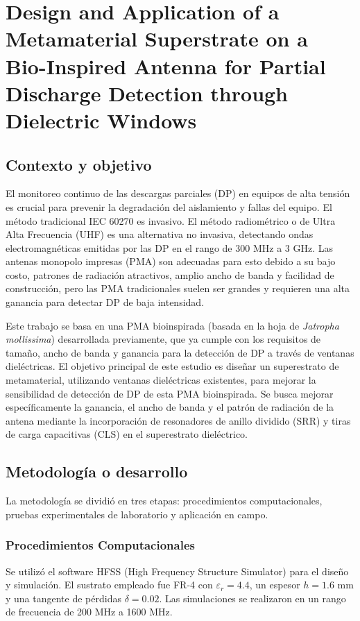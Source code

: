 \section{Design and Application of a Metamaterial Superstrate on a Bio-Inspired Antenna for Partial Discharge Detection through Dielectric Windows}

\subsection*{Contexto y objetivo}
El monitoreo continuo de las descargas parciales (DP) en equipos de alta tensión es crucial para prevenir la degradación del aislamiento y fallas del equipo. El método tradicional IEC 60270 es invasivo. El método radiométrico o de Ultra Alta Frecuencia (UHF) es una alternativa no invasiva, detectando ondas electromagnéticas emitidas por las DP en el rango de 300 MHz a 3 GHz. Las antenas monopolo impresas (PMA) son adecuadas para esto debido a su bajo costo, patrones de radiación atractivos, amplio ancho de banda y facilidad de construcción, pero las PMA tradicionales suelen ser grandes y requieren una alta ganancia para detectar DP de baja intensidad.

Este trabajo se basa en una PMA bioinspirada (basada en la hoja de \textit{Jatropha mollissima}) desarrollada previamente, que ya cumple con los requisitos de tamaño, ancho de banda y ganancia para la detección de DP a través de ventanas dieléctricas. El objetivo principal de este estudio es diseñar un superestrato de metamaterial, utilizando ventanas dieléctricas existentes, para mejorar la sensibilidad de detección de DP de esta PMA bioinspirada. Se busca mejorar específicamente la ganancia, el ancho de banda y el patrón de radiación de la antena mediante la incorporación de resonadores de anillo dividido (SRR) y tiras de carga capacitivas (CLS) en el superestrato dieléctrico.

\subsection*{Metodología o desarrollo}
La metodología se dividió en tres etapas: procedimientos computacionales, pruebas experimentales de laboratorio y aplicación en campo.

\subsubsection*{Procedimientos Computacionales}
Se utilizó el software HFSS (High Frequency Structure Simulator) para el diseño y simulación. El sustrato empleado fue FR-4 con $\varepsilon_r = 4.4$, un espesor $h = 1.6$ mm y una tangente de pérdidas $\delta = 0.02$. Las simulaciones se realizaron en un rango de frecuencia de 200 MHz a 1600 MHz.

